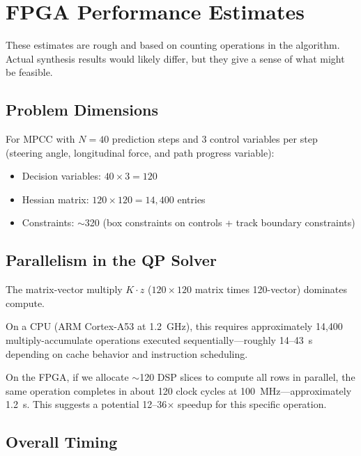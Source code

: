 \documentclass[12pt,a4paper]{article}
\begin{document}
\section{FPGA Performance Estimates}

These estimates are rough and based on counting operations in the algorithm. Actual synthesis results would likely differ, but they give a sense of what might be feasible.

\subsection{Problem Dimensions}

For MPCC with $N=40$ prediction steps and 3 control variables per step (steering angle, longitudinal force, and path progress variable):

\begin{itemize}
    \item Decision variables: $40 \times 3 = 120$
    \item Hessian matrix: $120 \times 120 = 14{,}400$ entries
    \item Constraints: $\sim$320 (box constraints on controls + track boundary constraints)
\end{itemize}

\subsection{Parallelism in the QP Solver}

The matrix-vector multiply $K \cdot z$ ($120 \times 120$ matrix times 120-vector) dominates compute.

On a CPU (ARM Cortex-A53 at 1.2~GHz), this requires approximately 14,400 multiply-accumulate operations executed sequentially---roughly 14--43~\textmu s depending on cache behavior and instruction scheduling.

On the FPGA, if we allocate $\sim$120 DSP slices to compute all rows in parallel, the same operation completes in about 120 clock cycles at 100~MHz---approximately 1.2~\textmu s. This suggests a potential 12--36$\times$ speedup for this specific operation.

\subsection{Overall Timing}
\end{document}
